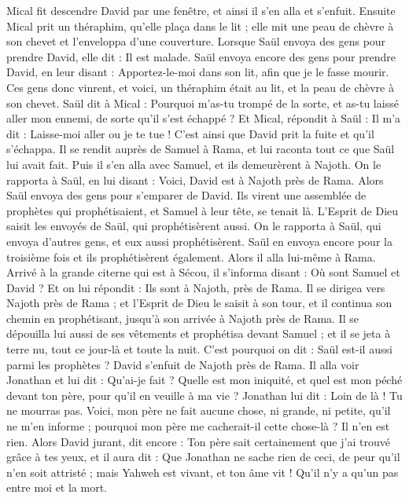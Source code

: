 \begin{multicols}{2}
Mical fit descendre David par une fenêtre, et ainsi il s'en alla et s'enfuit.
Ensuite Mical prit un théraphim, qu’elle plaça dans le lit ; elle mit une peau de chèvre à son chevet et l’enveloppa d'une couverture.
Lorsque Saül envoya des gens pour prendre David, elle dit : Il est malade.
Saül envoya encore des gens pour prendre David, en leur disant : Apportez-le-moi dans son lit, afin que je le fasse mourir.
Ces gens donc vinrent, et voici, un théraphim était au lit, et la peau de chèvre à son chevet.
Saül dit à Mical : Pourquoi m'as-tu trompé de la sorte, et as-tu laissé aller mon ennemi, de sorte qu'il s’est échappé ? Et Mical, répondit à Saül : Il m'a dit : Laisse-moi aller ou je te tue !
C’est ainsi que David prit la fuite et qu’il s’échappa. Il se rendit auprès de Samuel à Rama, et lui raconta tout ce que Saül lui avait fait. Puis il s'en alla avec Samuel, et ils demeurèrent à Najoth.
On le rapporta à Saül, en lui disant : Voici, David est à Najoth près de Rama.
Alors Saül envoya des gens pour s’emparer de David. Ils virent une assemblée de prophètes qui prophétisaient, et Samuel à leur tête, se tenait là. L'Esprit de Dieu saisit les envoyés de Saül, qui prophétisèrent aussi.
On le rapporta à Saül, qui envoya d'autres gens, et eux aussi prophétisèrent. Saül en envoya encore pour la troisième fois et ils prophétisèrent également.
Alors il alla lui-même à Rama. Arrivé à la grande citerne qui est à Sécou, il s'informa disant : Où sont Samuel et David ? Et on lui répondit : Ils sont à Najoth, près de Rama.
Il se dirigea vers Najoth près de Rama ; et l'Esprit de Dieu le saisit à son tour, et il continua son chemin en prophétisant, jusqu'à son arrivée à Najoth près de Rama.
Il se dépouilla lui aussi de ses vêtements et prophétisa devant Samuel ; et il se jeta à terre nu, tout ce jour-là et toute la nuit. C'est pourquoi on dit : Saül est-il aussi parmi les prophètes ?
\VerseOne{}David s'enfuit de Najoth près de Rama. Il alla voir Jonathan et lui dit : Qu'ai-je fait ? Quelle est mon iniquité, et quel est mon péché devant ton père, pour qu'il en veuille à ma vie ?
Jonathan lui dit : Loin de là ! Tu ne mourras pas. Voici, mon père ne fait aucune chose, ni grande, ni petite, qu'il ne m’en informe ; pourquoi mon père me cacherait-il cette chose-là ? Il n'en est rien.
Alors David jurant, dit encore : Ton père sait certainement que j’ai trouvé grâce à tes yeux, et il aura dit : Que Jonathan ne sache rien de ceci, de peur qu'il n'en soit attristé ; mais Yahweh est vivant, et ton âme vit ! Qu'il n'y a qu'un pas entre moi et la mort.

\end{multicols}

